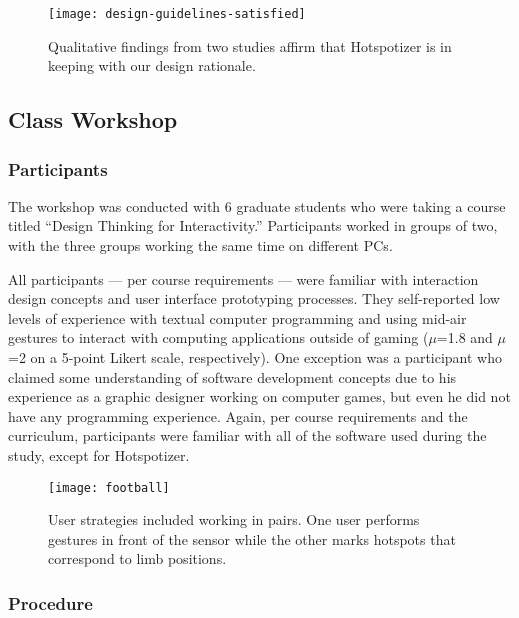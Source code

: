 \begin{SCfigure}[\sidecaptionrelwidth][t]
\centering
\texttt{[image: design-guidelines-satisfied]}
\caption{Qualitative findings from two studies affirm that Hotspotizer is in keeping with our design rationale.}
\label{fig:design-guidelines-satisfied}
\end{SCfigure}

\subsection{Class Workshop}

\subsubsection{Participants}

The workshop was conducted with 6 graduate students who were taking a course titled “Design Thinking for Interactivity.” Participants worked in groups of two, with the three groups working the same time on different PCs.

All participants --- per course requirements --- were familiar with interaction design concepts and user interface prototyping processes. They self-reported low levels of experience with textual computer programming and using mid-air gestures to interact with computing applications outside of gaming ($\mu$=1.8 and $\mu$=2 on a 5-point Likert scale, respectively). One exception was a participant who claimed some understanding of software development concepts due to his experience as a graphic designer working on computer games, but even he did not have any programming experience. Again, per course requirements and the curriculum, participants were familiar with all of the software used during the study, except for Hotspotizer.

\begin{SCfigure}[\sidecaptionrelwidth][t]
\centering
\texttt{[image: football]}
\caption{User strategies included working in pairs. One user performs gestures in front of the sensor while the other marks hotspots that correspond to limb positions.}
\label{fig:football}
\end{SCfigure}

\subsubsection{Procedure}

